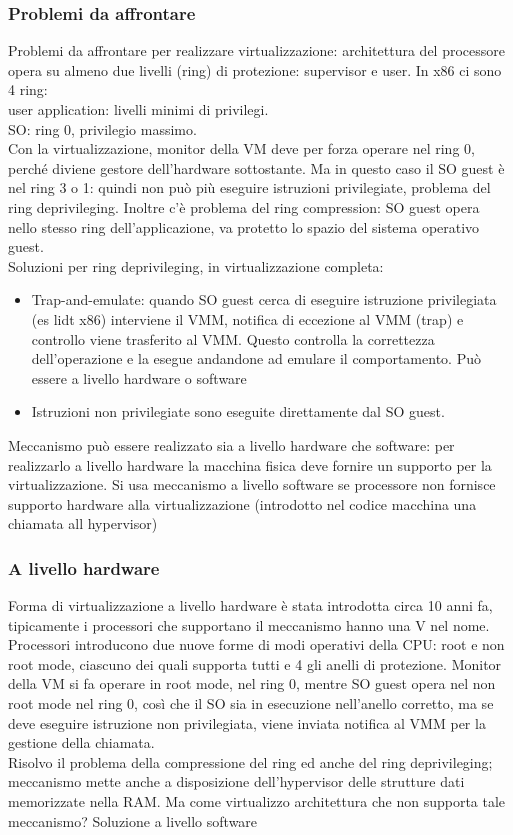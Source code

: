 \documentclass[16px]{article}
\begin{document}
\subsubsection{Problemi da affrontare}
Problemi da affrontare per realizzare virtualizzazione: architettura del processore opera su almeno due livelli (ring) di protezione: supervisor e user. In x86 ci sono 4 ring:\\ user application: livelli minimi di privilegi.\\
SO: ring 0, privilegio massimo.\\
Con la virtualizzazione, monitor della VM deve per forza operare nel ring 0, perché diviene gestore dell'hardware sottostante. Ma in questo caso il SO guest è nel ring 3 o 1: quindi non può più eseguire istruzioni privilegiate, problema del ring deprivileging. Inoltre c'è problema del ring compression: SO guest opera nello stesso ring dell'applicazione, va protetto lo spazio del sistema operativo guest.\\ Soluzioni per ring deprivileging, in virtualizzazione completa:
\begin{itemize}
\item Trap-and-emulate: quando SO guest cerca di eseguire istruzione privilegiata (es lidt x86) interviene il VMM, notifica di eccezione al VMM (trap) e controllo viene trasferito al VMM. Questo controlla la correttezza dell'operazione e la esegue andandone ad emulare il comportamento. Può essere a livello hardware o software
\item Istruzioni non privilegiate sono eseguite direttamente dal SO guest.
\end{itemize}
Meccanismo può essere realizzato sia a livello hardware che software: per realizzarlo a livello hardware la macchina fisica deve fornire un supporto per la virtualizzazione. Si usa meccanismo a livello software se processore non fornisce supporto hardware alla virtualizzazione (introdotto nel codice macchina una chiamata all hypervisor)
\subsubsection{A livello hardware}
Forma di virtualizzazione a livello hardware è stata introdotta circa 10 anni fa, tipicamente i processori che supportano il meccanismo hanno una V nel nome.\\ Processori introducono due nuove forme di modi operativi della CPU: root e non root mode, ciascuno dei quali supporta tutti e 4 gli anelli di protezione. Monitor della VM si fa operare in root mode, nel ring 0, mentre SO guest opera nel non root mode nel ring 0, così che il SO sia in esecuzione nell'anello corretto, ma se deve eseguire istruzione non privilegiata, viene inviata notifica al VMM per la gestione della chiamata.\\ Risolvo il problema della compressione del ring ed anche del ring deprivileging; meccanismo mette anche a disposizione dell'hypervisor delle strutture dati memorizzate nella RAM. Ma come virtualizzo architettura che non supporta tale meccanismo? Soluzione a livello software
\end{document}
